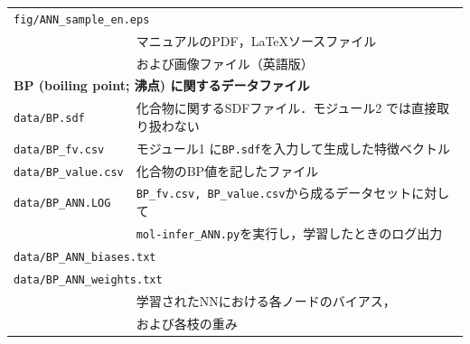 \documentclass[11pt,titlepage,dvipdfmx,twoside]{jsbook}
\begin{document}
{\begin{table}[h!]
\begin{tabular}{lcll}
  \multicolumn{4}{l}{\tt fig/ANN\_sample\_en.eps}\\
  &&\multicolumn{2}{l}{マニュアルのPDF，\LaTeX ソースファイル}\\
  &&\multicolumn{2}{l}{および画像ファイル（英語版）}\\
  \hline
  \multicolumn{4}{l}{\bf BP (boiling point; 沸点) に関するデータファイル~\cite{pubchem}}\\
  \multicolumn{2}{l}{\tt data/BP.sdf} & \multicolumn{2}{l}{化合物に関するSDFファイル．モジュール2 では直接取り扱わない}\\
  \multicolumn{2}{l}{\tt data/BP\_fv.csv} & \multicolumn{2}{l}{モジュール1 に{\tt BP.sdf}を入力して生成した特徴ベクトル}\\
  \multicolumn{2}{l}{\tt data/BP\_value.csv} & \multicolumn{2}{l}{化合物のBP値を記したファイル}\\
  \multicolumn{2}{l}{\tt data/BP\_ANN.LOG} & \multicolumn{2}{l}{{\tt BP\_fv.csv, BP\_value.csv}から成るデータセットに対して}\\
  &&\multicolumn{2}{l}{{\tt mol-infer\_ANN.py}を実行し，学習したときのログ出力}\\
  \multicolumn{4}{l}{\tt data/BP\_ANN\_biases.txt} \\
  \multicolumn{4}{l}{\tt data/BP\_ANN\_weights.txt} \\
  &&\multicolumn{2}{l}{学習されたNNにおける各ノードのバイアス，}\\
  &&\multicolumn{2}{l}{および各枝の重み}\\
  \hline
  \end{tabular}
\end{table}

\newpage

}
\end{document}
